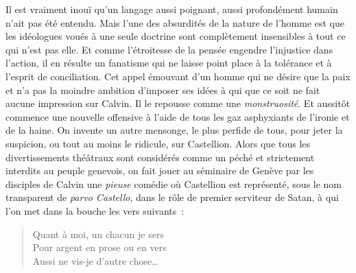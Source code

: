 \documentclass[french,twoside]{book} %
\begin{document}
\noindent Il est vraiment inouï qu’un langage aussi poignant, aussi profondément humain n’ait pas été entendu. Mais l’une des absurdités de la nature de l’homme est que les idéologues voués à une seule doctrine sont complètement insensibles à tout ce qui n’est pas elle. Et comme l’étroitesse de la pensée engendre l’injustice dans l’action, il en résulte un fanatisme qui ne laisse point place à la tolérance et à l’esprit de conciliation. Cet appel émouvant d’un homme qui ne désire que la paix et n’a pas la moindre ambition d’imposer ses idées à qui que ce soit ne fait aucune impression sur Calvin. Il le repousse comme une \emph{monstruosité}. Et aussitôt commence une nouvelle offensive à l’aide de tous les gaz asphyxiants de l’ironie et de la haine. On invente un autre mensonge, le plus perfide de tous, pour jeter la suspicion, ou tout au moins le ridicule, sur Castellion. Alors que tous les divertissements théâtraux sont considérés comme un péché et strictement interdits au peuple genevois, on fait jouer au séminaire de Genève par les disciples de Calvin une \emph{pieuse} comédie où Castellion est représenté, sous le nom transparent de \emph{parvo Castello}, dans le rôle de premier serviteur de Satan, à qui l’on met dans la bouche les vers suivants :\par


\begin{verse}
Quant à moi, un chacun je sers\\
Pour argent en prose ou en vers\\
Aussi ne vis-je d’autre chose…\\
\end{verse}
\end{document}
